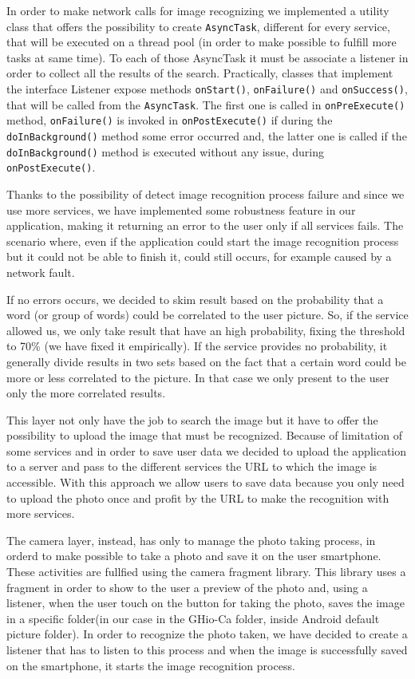 In order to make network calls for image recognizing we implemented a utility 
class that offers the possibility to create \texttt{AsyncTask}, different for every 
service, that will be executed on a thread pool (in order to make possible to 
fulfill more tasks at same time). To each of those AsyncTask it must be associate 
a listener in order to collect all the results of the search. Practically, 
classes that implement the interface Listener expose methods \texttt{onStart()}, 
\texttt{onFailure()} and \texttt{onSuccess()}, that will be called from the \texttt{AsyncTask}. The 
first one is called in \texttt{onPreExecute()} method, \texttt{onFailure()} is invoked in 
\texttt{onPostExecute()} if during the \texttt{doInBackground()} method some error occurred 
and, the latter one is called if the \texttt{doInBackground()} method is executed 
without any issue, during \texttt{onPostExecute()}.

Thanks to the possibility of detect image recognition process failure and since 
we use more services, we have implemented some robustness feature in our 
application, making it returning an error to the user only if all services fails. 
The scenario where, even if the application could start the image recognition 
process but it could not be able to finish it, could still occurs, for example 
caused by a network fault.

If no errors occurs, we decided to skim result based on the probability that a 
word (or group of words) could be correlated to the user picture. So, if the 
service allowed us, we only take result that have an high probability, fixing the 
threshold to 70\% (we have fixed it empirically). If the service provides no 
probability, it generally divide results in two sets based on the fact that a 
certain word could be more or less correlated to the picture. In that case we 
only present to the user only the more correlated results.

This layer not only have the job to search the image but it have to offer the 
possibility to upload the image that must be recognized. Because of limitation 
of some services and in order to save user data we decided to upload the 
application to a server and pass to the different services the URL to which the 
image is accessible. With this approach we allow users to save data because you 
only need to upload the photo once and profit by the URL to make the recognition 
with more services.

The camera layer, instead, has only to manage the photo taking process, in 
orderd to make possible to take a photo and save it on the user smartphone. These
activities are fullfied using the camera fragment library. This library uses a 
fragment in order to show to the user a preview of the photo and, using a 
listener, when the user touch on the button for taking the photo, saves the 
image in a specific folder(in our case in the GHio-Ca folder, inside Android 
default picture folder). In order to recognize the photo taken, we have decided 
to create a listener that has to listen to this process and when the image is 
successfully saved on the smartphone, it starts the image recognition process. 


